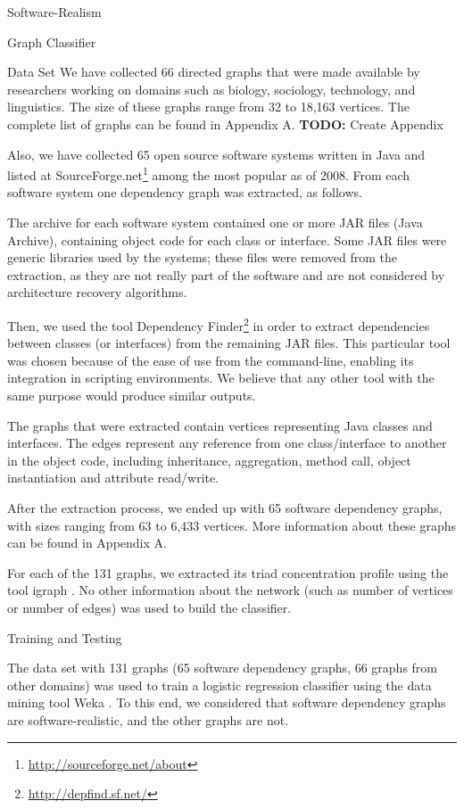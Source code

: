 \documentclass[11pt,twocolumn,a4paper,english]{article}
\newcommand{\TODO}{\textbf{TODO:} }
\begin{document}
\begin{section}{Software-Realism}
\begin{subsection}{Graph Classifier}
\begin{subsubsection}{Data Set}
	We have collected 66 directed graphs that were made available by researchers working on domains such as biology, sociology, technology, and linguistics. The size of these graphs range from 32 to 18,163 vertices. The complete list of graphs can be found in Appendix A. \TODO Create Appendix
	
	Also, we have collected 65 open source software systems written in Java and listed at SourceForge.net\footnote{\url{http://sourceforge.net/about}} among the most popular as of 2008. From each software system one dependency graph was extracted, as follows.
	
	The archive for each software system contained one or more JAR files (Java Archive), containing object code for each class or interface. Some JAR files were generic libraries used by the systems; these files were removed from the extraction, as they are not really part of the software and are not considered by architecture recovery algorithms.
	
	Then, we used the tool Dependency Finder\footnote{\url{http://depfind.sf.net/}} in order to extract dependencies between classes (or interfaces) from the remaining JAR files. This particular tool was chosen because of the ease of use from the command-line, enabling its integration in scripting environments. We believe that any other tool with the same purpose would produce similar outputs.
	
	The graphs that were extracted contain vertices representing Java classes and interfaces. The edges represent any reference from one class/interface to another in the object code, including inheritance, aggregation, method call, object instantiation and attribute read/write.
	
	After the extraction process, we ended up with 65 software dependency graphs, with sizes ranging from 63 to 6,433 vertices. More information about these graphs can be found in Appendix A. %
	
	For each of the 131 graphs, we extracted its triad concentration profile using the tool igraph \cite{igraph}. No other information about the network (such as number of vertices or number of edges) was used to build the classifier.

\end{subsubsection}

\begin{subsubsection}{Training and Testing}
	
	The data set with 131 graphs (65 software dependency graphs, 66 graphs from other domains) was used to train a logistic regression classifier using the data mining tool Weka \cite{weka}. To this end, we considered that software dependency graphs are software-realistic, and the other graphs are not. 
		

\end{subsubsection}
\end{subsection}
\end{section}
\end{document}
